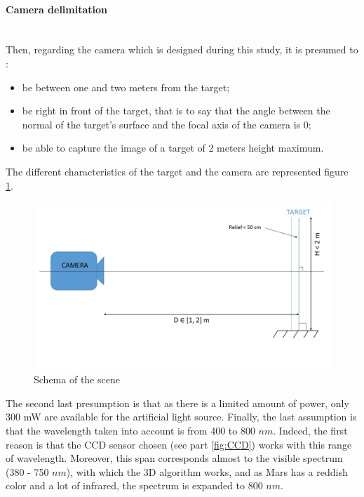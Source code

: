 \paragraph*{Camera delimitation}
~\\
Then, regarding the camera which is designed during this study, it is presumed to :
\begin{itemize}
\item be between one and two meters from the target;
\item be right in front of the target, that is to say that the angle between the normal of the target's surface and the focal axis of the camera is 0\textdegree;
\item be able to capture the image of a target of 2 meters height maximum.
\end{itemize}

The different characteristics of the target and the camera are represented figure \ref{fig:schema system}.


\begin{figure}[h]
  \centerline{\includegraphics[scale=0.4]{fig/schemaSystem.jpg}}
  \caption{Schema of the scene}
  \label{fig:schema system}
\end{figure}

The second last presumption is that as there is a limited amount of power, only 300 mW are available for the artificial light source. Finally, the last assumption is that the wavelength taken into account is from 400 to 800 $nm$. Indeed, the first reason is that the CCD sensor chosen (see part \ref{fig:CCD}) works with this range of wavelength. Moreover, this span corresponds almost to the visible spectrum (380 - 750 $nm$), with which the 3D algorithm works, and as Mars has a reddish color and a lot of infrared, the spectrum is expanded to 800 $nm$.
